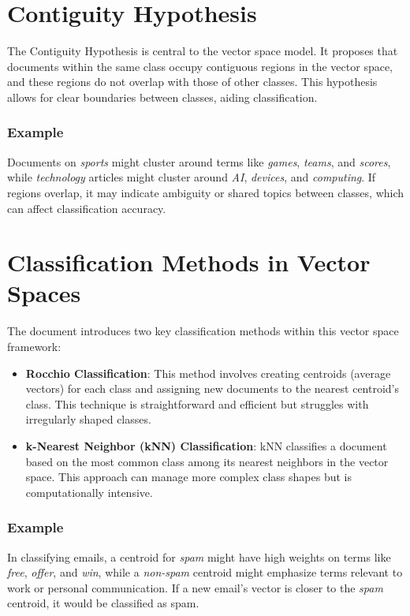 \documentclass{article}
\begin{document}
\section{Contiguity Hypothesis}

The Contiguity Hypothesis is central to the vector space model. It proposes that documents within the same class occupy contiguous regions in the vector space, and these regions do not overlap with those of other classes. This hypothesis allows for clear boundaries between classes, aiding classification.

\subsubsection*{Example}
Documents on \textit{sports} might cluster around terms like \textit{games}, \textit{teams}, and \textit{scores}, while \textit{technology} articles might cluster around \textit{AI}, \textit{devices}, and \textit{computing}. If regions overlap, it may indicate ambiguity or shared topics between classes, which can affect classification accuracy.

\section{Classification Methods in Vector Spaces}

The document introduces two key classification methods within this vector space framework:

\begin{itemize}
    \item \textbf{Rocchio Classification}: This method involves creating centroids (average vectors) for each class and assigning new documents to the nearest centroid's class. This technique is straightforward and efficient but struggles with irregularly shaped classes.
    
    \item \textbf{k-Nearest Neighbor (kNN) Classification}: kNN classifies a document based on the most common class among its nearest neighbors in the vector space. This approach can manage more complex class shapes but is computationally intensive.
\end{itemize}

\subsubsection*{Example}
In classifying emails, a centroid for \textit{spam} might have high weights on terms like \textit{free}, \textit{offer}, and \textit{win}, while a \textit{non-spam} centroid might emphasize terms relevant to work or personal communication. If a new email's vector is closer to the \textit{spam} centroid, it would be classified as spam.
\end{document}

